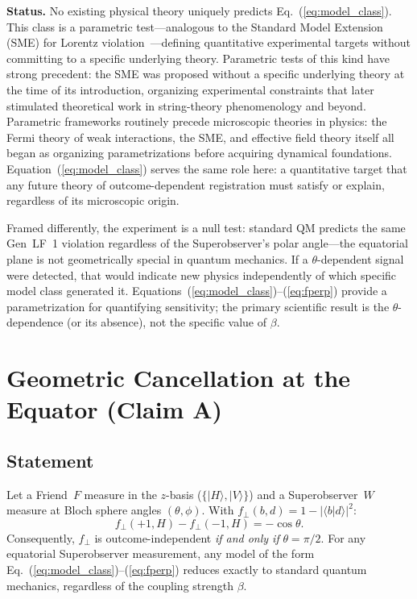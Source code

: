 \documentclass[twocolumn,aps,pra,superscriptaddress,floatfix,10pt]{revtex4-2}
\begin{document}
\textbf{Status.} No existing physical theory uniquely predicts
Eq.~(\ref{eq:model_class}). This class is a parametric test---analogous
to the Standard Model Extension (SME) for Lorentz
violation~\cite{Colladay1997}---defining quantitative experimental
targets without committing to a specific underlying theory. Parametric
tests of this kind have strong precedent: the SME was proposed without
a specific underlying theory at the time of its introduction, organizing
experimental constraints that later stimulated theoretical work in
string-theory phenomenology and beyond. Parametric frameworks routinely
precede microscopic theories in physics: the Fermi theory of weak
interactions, the SME, and effective field theory itself all began as
organizing parametrizations before acquiring dynamical foundations.
Equation~(\ref{eq:model_class}) serves the same role here: a
quantitative target that any future theory of outcome-dependent
registration must satisfy or explain, regardless of its microscopic
origin.

Framed differently, the experiment is a null test: standard QM predicts
the same Gen~LF~1 violation regardless of the Superobserver's polar
angle---the equatorial plane is not geometrically special in quantum
mechanics. If a $\theta$-dependent signal were detected, that would
indicate new physics independently of which specific model class generated
it. Equations~(\ref{eq:model_class})--(\ref{eq:fperp}) provide a
parametrization for quantifying sensitivity; the primary scientific result
is the $\theta$-dependence (or its absence), not the specific value of
$\beta$.

\section{Geometric Cancellation at the Equator (Claim A)}
\label{sec:theorem}

\subsection{Statement}

Let a Friend~$F$ measure in the $z$-basis ($\{|H\rangle,|V\rangle\}$)
and a Superobserver~$W$ measure at Bloch sphere angles $(\theta,\phi)$.
With $f_\perp(b,d) = 1 - |\langle b|d\rangle|^2$:
\begin{equation}
f_\perp(+1,H) - f_\perp(-1,H) = -\cos\theta.
\label{eq:cancel}
\end{equation}
Consequently, $f_\perp$ is outcome-independent \emph{if and only if}
$\theta = \pi/2$. For any equatorial Superobserver measurement, any
model of the form Eq.~(\ref{eq:model_class})--(\ref{eq:fperp}) reduces
exactly to standard quantum mechanics, regardless of the coupling
strength $\beta$.
\end{document}
